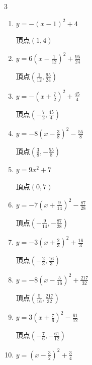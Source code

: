 \begin{multicols}{3}
\begin{enumerate}
        $\displaystyle 頂点\left( -\frac{3}{4} , \frac{45}{8} \right)$

  \item $\displaystyle y=-\left( x-1\right)^{2}+4$

        $\displaystyle 頂点\left( 1 , 4 \right)$

  \item $\displaystyle y=6\left( x-\frac{1}{12}\right)^{2}+\frac{95}{24}$

        $\displaystyle 頂点\left( \frac{1}{12} , \frac{95}{24} \right)$

  \item $\displaystyle y=-\left( x+\frac{7}{2}\right)^{2}+\frac{45}{4}$

        $\displaystyle 頂点\left( -\frac{7}{2} , \frac{45}{4} \right)$

  \item $\displaystyle y=-8\left( x-\frac{3}{8}\right)^{2}-\frac{55}{8}$

        $\displaystyle 頂点\left( \frac{3}{8} , -\frac{55}{8} \right)$

\columnbreak %

  \item $\displaystyle y=9x^{2}+7$

        $\displaystyle 頂点\left( 0 , 7 \right)$

  \item $\displaystyle y=-7\left( x+\frac{9}{14}\right)^{2}-\frac{87}{28}$

        $\displaystyle 頂点\left( -\frac{9}{14} , -\frac{87}{28} \right)$

  \item $\displaystyle y=-3\left( x+\frac{2}{3}\right)^{2}+\frac{16}{3}$

        $\displaystyle 頂点\left( -\frac{2}{3} , \frac{16}{3} \right)$

  \item $\displaystyle y=-8\left( x-\frac{5}{16}\right)^{2}+\frac{217}{32}$

        $\displaystyle 頂点\left( \frac{5}{16} , \frac{217}{32} \right)$

  \item $\displaystyle y=3\left( x+\frac{7}{6}\right)^{2}-\frac{61}{12}$

        $\displaystyle 頂点\left( -\frac{7}{6} , -\frac{61}{12} \right)$

  \item $\displaystyle y=\left( x-\frac{3}{2}\right)^{2}+\frac{3}{4}$


\end{enumerate}
\end{multicols}
